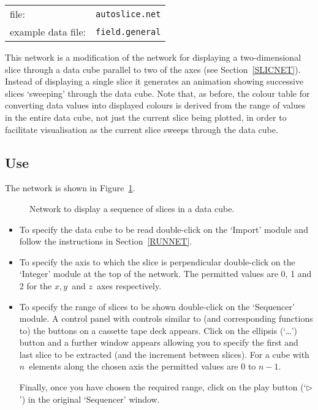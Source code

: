 \begin{tabular}{ll}
file:              & {\tt autoslice.net} \\
example data file: & {\tt field.general} \\
\end{tabular}

This network is a modification of the network for displaying a
two-dimensional slice through a data cube parallel to two of the axes
(see Section~\ref{SLICNET}). Instead of displaying a single slice it
generates an animation showing successive slices `sweeping' through the
data cube. Note that, as before, the colour table for converting data
values into displayed colours is derived from the range of values in the
entire data cube, not just the current slice being plotted, in order to
facilitate visualisation as the current slice sweeps through the data
cube.

\subsection{Use}

The network is shown in Figure~\ref{ASLICNETF}.

\begin{figure}[htbp]

\begin{center}
\leavevmode
\epsfxsize=553pt
\end{center}

\caption[Network to display a sequence of slices in a data cube.]{Network
to display a sequence of slices in a data cube. \label{ASLICNETF} }

\end{figure}

\begin{itemize}

  \item To specify the data cube to be read double-click on the `Import'
   module and follow the instructions in Section~\ref{RUNNET}.

  \item To specify the axis to which the slice is perpendicular
   double-click on the `Integer' module at the top of the network. The
   permitted values are 0, 1 and 2 for the $x, y$\, and $z$\, axes
   respectively.

  \item To specify the range of slices to be shown double-click on the
   `Sequencer' module. A control panel with controls similar to (and
   corresponding functions to) the buttons on a cassette tape deck
   appears. Click on the ellipsis (`\ldots') button and a further window
   appears allowing you to specify the first and last slice to be
   extracted (and the increment between slices). For a cube with $n$\,
   elements along the chosen axis the permitted values are 0 to $n-1$.

   Finally, once you have chosen the required range, click on the play
   button (`$\triangleright$') in the original `Sequencer' window.

\end{itemize}

